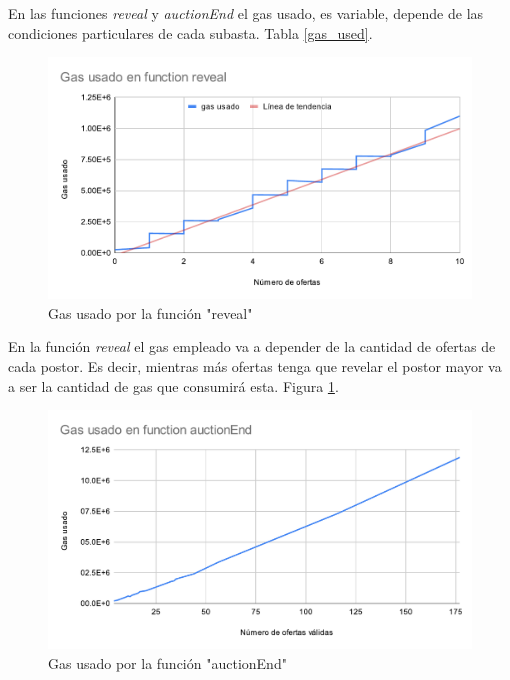   
        En las funciones \textit{reveal} y \textit{auctionEnd} el gas usado, es variable, depende de las
        condiciones particulares de cada subasta. Tabla \ref{gas_used}.
  
  
        \begin{figure}
          \centering
          \includegraphics[scale=0.9]{Graphics/gas_reveal.pdf}
          \caption{Gas usado por la función "reveal"}
          \label{gas_reveal}
        \end{figure} 
    
        En la función \textit{reveal} el gas empleado va a depender de la cantidad de ofertas de cada postor.
        Es decir, mientras más ofertas tenga que revelar el postor mayor va a ser la cantidad de gas que
        consumirá esta. Figura \ref{gas_reveal}.
  
  
        \begin{figure}
          \centering
          \includegraphics[scale=0.9]{Graphics/gas_auctionEnd.pdf}
          \caption{Gas usado por la función "auctionEnd"}
          \label{gas_auctionEnd}
        \end{figure} 
    
